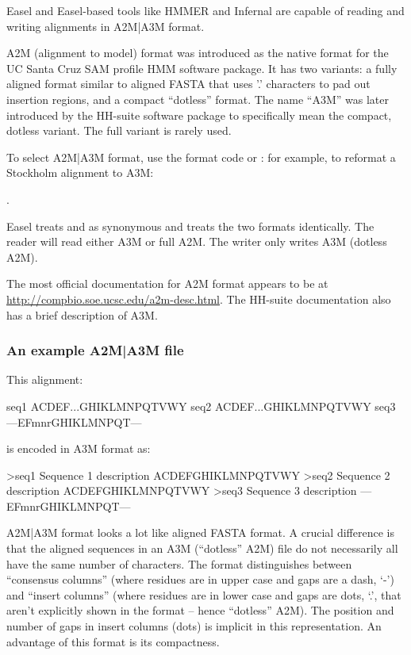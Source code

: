 Easel and Easel-based tools like HMMER and Infernal are capable of
reading and writing alignments in A2M|A3M format.

A2M (alignment to model) format was introduced as the native format
for the UC Santa Cruz SAM profile HMM software package.  It has two
variants: a fully aligned format similar to aligned FASTA that uses
'.' characters to pad out insertion regions, and a compact ``dotless''
format. The name ``A3M'' was later introduced by the HH-suite software
package to specifically mean the compact, dotless variant. The full
variant is rarely used.

To select A2M|A3M format, use the format code  or
: for example, to reformat a Stockholm alignment to A3M:

.

Easel treats  and  as synonymous and treats the
two formats identically. The reader will read either A3M or full A2M.
The writer only writes A3M (dotless A2M).

The most official documentation for A2M format appears to be at
\url{http://compbio.soe.ucsc.edu/a2m-desc.html}.  The HH-suite
documentation also has a brief description of A3M.

\subsubsection{An example A2M|A3M file}

This alignment:

\begin{cchunk}
seq1  ACDEF...GHIKLMNPQTVWY
seq2  ACDEF...GHIKLMNPQTVWY
seq3  ---EFmnrGHIKLMNPQT---
\end{cchunk}

\noindent 
is encoded in A3M format as:

\begin{cchunk}
>seq1  Sequence 1 description
ACDEFGHIKLMNPQTVWY
>seq2  Sequence 2 description
ACDEFGHIKLMNPQTVWY
>seq3  Sequence 3 description
---EFmnrGHIKLMNPQT---
\end{cchunk}

A2M|A3M format looks a lot like aligned FASTA format. A crucial difference
is that the aligned sequences in an A3M (``dotless'' A2M) file do not
necessarily all have the same number of characters. The format
distinguishes between ``consensus columns'' (where residues are in
upper case and gaps are a dash, `-') and ``insert columns'' (where
residues are in lower case and gaps are dots, `.', that aren't
explicitly shown in the format -- hence ``dotless'' A2M). The position
and number of gaps in insert columns (dots) is implicit in this
representation.  An advantage of this format is its compactness.

